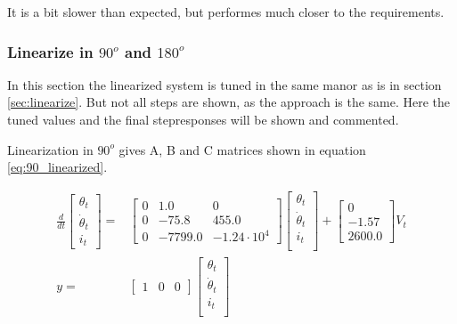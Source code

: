 \documentclass[../../../Main]{subfiles}
\begin{document}
It is a bit slower than expected, but performes much closer to the requirements.


\subsubsection{Linearize in $90^o$ and $180^o$}
In this section the linearized system is tuned in the same manor as is in section \ref{sec:linearize}. But not all steps are shown, as the approach is the same. Here the tuned values and the final stepresponses will be shown and commented.

Linearization in $90^o$ gives A, B and C matrices shown in equation \ref{eq:90_linearized}. 

\begin{equation}
      \label{eq:90_linearized}
      \begin{split}
      \frac{d}{dt}
    \begin{bmatrix}
        \theta_t \\
        \dot \theta_t \\
        i_t
    \end{bmatrix}
    =&
    \begin{bmatrix}  0 & 1.0 & 0\\ 0 & -75.8 & 455.0\\ 0 & -7799.0 & -1.24\cdot10^4 \end{bmatrix}
    \begin{bmatrix}
        \theta_t \\
        \dot \theta_t \\
        i_t \\
    \end{bmatrix}
    +
    \begin{bmatrix}
     0\\ -1.57\\ 2600.0
    \end{bmatrix}
    V_t
\\
      y =&
    \begin{bmatrix}
        1 & 0 & 0
    \end{bmatrix}
    \begin{bmatrix}
        \theta_t \\
        \dot \theta_t\\
        i_t\\
    \end{bmatrix}
    \end{split}
\end{equation}
\end{document}
